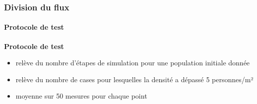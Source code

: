 \begin{frame}
\begin{columns}
    \end{columns}
\end{frame}

\begin{frame}
    \frametitle{Division du flux}
    \framesubtitle{Protocole de test}

    \textbf{Protocole de test}
    \begin{itemize}
        \item <2-> relève du nombre d'étapes de simulation pour une population initiale donnée
        \item <3-> relève du nombre de cases pour lesquelles la densité a dépassé 5 personnes/m²
        \item <4-> moyenne sur 50 mesures pour chaque point
    \end{itemize}

\end{frame}


